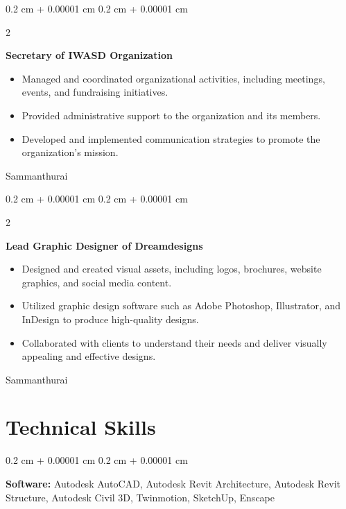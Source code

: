 \documentclass[10pt, letterpaper]{article}
\newenvironment{highlights}{
    \begin{itemize}[
        topsep=0.10 cm,
        parsep=0.10 cm,
        partopsep=0pt,
        itemsep=0pt,
        leftmargin=0.4 cm + 10pt
    ]
}{
    \end{itemize}
} %
\newenvironment{onecolentry}{
    \begin{adjustwidth}{
        0.2 cm + 0.00001 cm
    }{
        0.2 cm + 0.00001 cm
    }
}{
    \end{adjustwidth}
} %
\newenvironment{twocolentry}[2][]{
    \onecolentry
    \def\secondColumn{#2}
    \setcolumnwidth{\fill, 4.5 cm}
    \begin{paracol}{2}
    }{
    \switchcolumn \raggedleft \secondColumn
    \end{paracol}
    \endonecolentry
} %
\begin{document}
\vspace{0.2 cm}

\begin{twocolentry}{
    Sammanthurai
}
    \textbf{Secretary of IWASD Organization}
    \begin{highlights}
        \item Managed and coordinated organizational activities, including meetings, events, and fundraising initiatives.
        \item Provided administrative support to the organization and its members.
        \item Developed and implemented communication strategies to promote the organization's mission.
    \end{highlights}
\end{twocolentry}

\vspace{0.2 cm}

\begin{twocolentry}{
    Sammanthurai
}
    \textbf{Lead Graphic Designer of Dreamdesigns}
    \begin{highlights}
        \item Designed and created visual assets, including logos, brochures, website graphics, and social media content.
        \item Utilized graphic design software such as Adobe Photoshop, Illustrator, and InDesign to produce high-quality designs.
        \item Collaborated with clients to understand their needs and deliver visually appealing and effective designs.
    \end{highlights}
\end{twocolentry}





    
    \section{Technical Skills}



        
        \begin{onecolentry}
            \textbf{Software:} Autodesk AutoCAD, Autodesk Revit Architecture, Autodesk Revit Structure, Autodesk Civil 3D, Twinmotion, SketchUp, Enscape
        \end{onecolentry}
\end{document}
